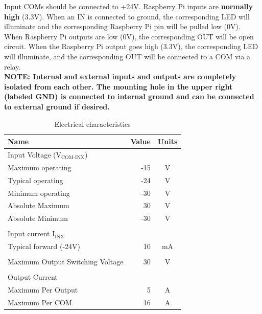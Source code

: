 \documentclass[titlepage]{article}
\begin{document}
Input COMs should be connected to +24V. Raspberry Pi inputs are \textbf{normally high} (3.3V). When an IN is connected to ground, the corresponding LED will illuminate and the corresponding Raspberry Pi pin will be pulled low (0V).\\

When Raspberry Pi outputs are low (0V), the corresponding OUT will be open circuit. When the Raspberry Pi output goes high (3.3V), the corresponding LED will illuminate, and the corresponding OUT will be connected to a COM via a relay.\\

\textbf{
NOTE: Internal and external inputs and outputs are completely isolated from each other. The mounting hole in the upper right (labeled GND) is connected to internal ground and can be connected to external ground if desired.}\\


\begin{table}[h!]
\centering
    \begin{tabular}{|l|r|c|}
    \hline
    Name  & Value & Units   \\ \hline
    Input Voltage ($\text{V}_{\text{COM-INX}}$)  &  &    \\ \hline
    Maximum operating & -15 & V\\ \hline
    Typical operating & -24 & V \\ \hline
    Minimum operating & -30 & V \\ \hline
    Absolute Maximum &  30 & V \\ \hline
    Absolute Minimum & -30 & V \\ \hline
    & & \\ \hline
    Input current $\text{I}_\text{INX}$ & & \\ \hline
    Typical forward (-24V) & 10 & mA \\ \hline
    & & \\ \hline
    Maximum Output Switching Voltage & 30 & V \\ \hline
    & & \\ \hline
    Output Current & & \\ \hline
    Maximum Per Output & 5 & A \\ \hline 
    Maximum Per COM & 16 & A \\ \hline

    \end{tabular}
\caption{Electrical characteristics}
\label{table:elec_char}
\end{table} 
\end{document}

